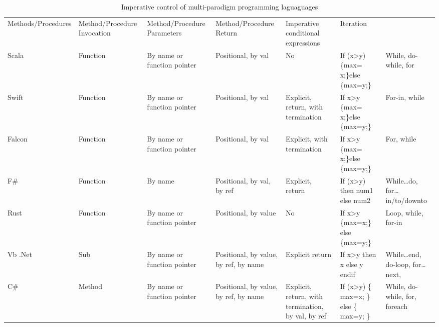 \documentclass{sig-alternate}
\begin{document}
\begin{table*}[H]
\centering
\caption{Imperative control of multi-paradigm programming laguaguages}
\label{my-label}
\begin{tabular}{|l|l|l|l|l|l|l|}
\hline                   \\ \hline
Methods/Procedures & Method/Procedure Invocation & Method/Procedure Parameters & Method/Procedure Return               & Imperative conditional expressions                 & Iteration                                            &                               \\ \hline
Scala              & Function                    & By name or function pointer & Positional, by val                    & No                                                 & If (x\textgreater{}y) \{max= x;\}else \{max=y;\}     & While, do-while, for          \\ \hline
Swift              & Function                    & By name or function pointer & Positional, by val                    & Explicit, return, with termination                 & If x\textgreater{}y \{max= x;\}else \{max=y;\}       & For-in, while                 \\ \hline
Falcon             & Function                    & By name or function pointer & Positional, by val                    & Explicit, with termination                         & If x\textgreater{}y \{max= x;\}else \{max=y;\}       & For, while                    \\ \hline
F\#                & Function                    & By name                     & Positional, by val, by ref            & Explicit, return                                   & If (x\textgreater{}y) then num1 else num2            & While…do, for…in/to/downto    \\ \hline
Rust               & Function                    & By name or function pointer & Positional, by value                  & No                                                 & If x\textgreater{}y \{max=x;\} else \{max=y;\}       & Loop, while, for-in           \\ \hline
Vb .Net            & Sub                         & By name or function pointer & Positional, by value, by ref, by name & Explicit return                                    & If x\textgreater{}y then x else y endif              & While…end, do-loop, for…next, \\ \hline
C\#                & Method                      & By name or function pointer & Positional, by value, by ref, by name & Explicit, return, with termination, by val, by ref & If (x\textgreater{}y) \{ max=x; \} else \{ max=y; \} & While, do-while, for, foreach \\ \hline

\end{tabular}
\end{table*}
\end{document}
